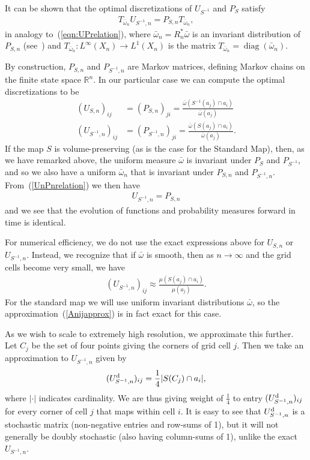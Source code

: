 \documentclass{aims}
\theoremstyle{definition}
\begin{document}
It can be shown that the optimal discretizations of $U_{S^{-1}}$ and
$P_S$ satisfy
\begin{align}
  \label{UnPnrelation}
  T_{\bar{\omega}_n} U_{S^{-1},n}
  = P_{S,n} T_{\bar{\omega}_n},
\end{align}
in analogy to~(\ref{eqn:UPrelation}), where $\bar{\omega}_n = R_n^*
\bar{\omega}$ is an invariant distribution of $P_{S,n}$
(see~\cite{BeLaLiWe2009}) and $T_{\bar{\omega}_n} :
L^\infty(X_n) \to L^1(X_n)$ is the matrix
$T_{\bar{\omega}_n} = \operatorname*{diag}(\bar{\omega}_n)$.

By construction, $P_{S,n}$ and $P_{S^{-1},n}$ are Markov matrices,
defining Markov chains on the finite state space $\mathbb{R}^n$. In
our particular case we can compute the optimal discretizations to be
\begin{align}
  (U_{S,n})_{ij} &= (P_{S,n})_{ji} = \frac{\bar{\omega}(S^{-1}(a_j)\cap a_i)}{\bar{\omega}(a_j)} \\
  (U_{S^{-1},n})_{ij} &= (P_{S^{-1},n})_{ji} = \frac{\bar{\omega}(S(a_j)\cap a_i)}{\bar{\omega}(a_j)}.
\end{align}
If the map $S$ is volume-preserving (as is the case for the Standard
Map), then, as we have remarked above, the uniform measure
$\bar{\omega}$ is invariant under $P_S$ and $P_{S^{-1}}$, and so
we also have a uniform $\bar{\omega}_n$ that is invariant under
$P_{S,n}$ and $P_{S^{-1},n}$. From~(\ref{UnPnrelation}) we then have
\begin{align}
  \label{eqn:vol_pres_Un_Pn_equal}
  U_{S^{-1},n} = P_{S,n}
\end{align}
and we see that the evolution of functions and probability measures
forward in time is identical.

For numerical efficiency, we do not use the exact expressions above
for $U_{S,n}$ or $U_{S^{-1},n}$. Instead, we recognize that if $\bar{\omega}$ is
smooth, then as $n \to \infty$ and the grid cells become very small, we have
\begin{align}
  \label{Anijapprox}
  (U_{S^{-1},n})_{ij} \approx  \frac{{\mu}(S(a_j)\cap a_i)}{\mu(a_j)}.
\end{align}
For the standard map we will use uniform invariant distributions
$\bar{\omega}$, so the approximation~(\ref{Anijapprox}) is in fact
exact for this case.

As we wish to scale to extremely high resolution, we approximate this
further. Let $C_j$ be the set of four points giving the corners of
grid cell $j$. Then we take an approximation to $U_{S^{-1},n}$ given by
\begin{align}
 \label{finegridmethod}
 (U_{S^{-1},n}^{\rm d})_{ij} = \frac{1}{4} |S(C_j) \cap a_i|,
\end{align}
where $|\cdot|$ indicates cardinality. We are thus giving weight of
$\frac{1}{4}$ to entry $(U_{S^{-1},n}^{\rm d})_{ij}$ for every corner
of cell $j$ that maps within cell $i$. It is easy to see that
$U_{S^{-1},n}^{\rm d}$ is a stochastic matrix (non-negative entries
and row-sums of 1), but it will not generally be doubly stochastic
(also having column-sums of 1), unlike the exact $U_{S^{-1},n}$.
\end{document}
